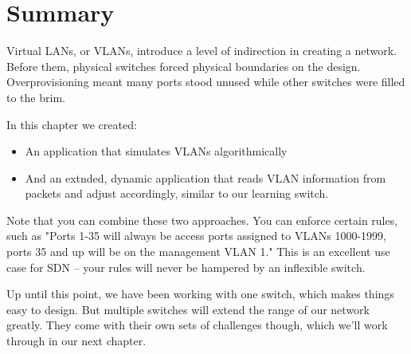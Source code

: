 \section{Summary}

Virtual LANs, or VLANs, introduce a level of indirection in creating a network.  Before them, physical
switches forced physical boundaries on the design.  Overprovisioning meant many ports stood unused while 
other switches were filled to the brim.  

In this chapter we created:

\begin{itemize}
\item An application that simulates VLANs algorithmically
\item And an extnded, dynamic application that reads VLAN information from packets and adjust accordingly, 
similar to our learning switch.
\end{itemize}

Note that you can combine these two approaches.  You can enforce certain rules, such as "Ports 1-35 will always
be access ports assigned to VLANs 1000-1999, ports 35 and up will be on the management VLAN 1."  This is an
excellent use case for SDN -- your rules will never be hampered by an inflexible switch.

Up until this point, we have been working with one switch, which makes things easy to design.  But multiple
switches will extend the range of our network greatly.  They come with their own sets of challenges though,
which we'll work through in our next chapter.  